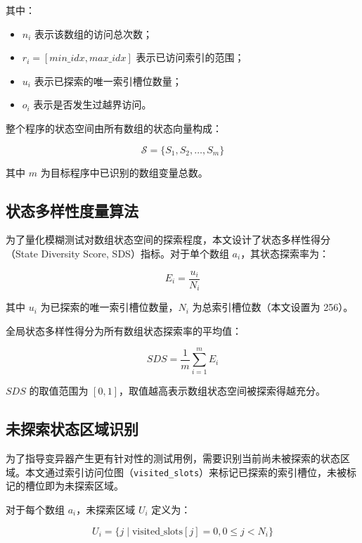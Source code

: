 \documentclass[bachelor]{njupthesis}
\begin{document}
其中：
\begin{itemize}
    \item $n_i$ 表示该数组的访问总次数；
    \item $r_i = [min\_idx, max\_idx]$ 表示已访问索引的范围；
    \item $u_i$ 表示已探索的唯一索引槽位数量；
    \item $o_i$ 表示是否发生过越界访问。
\end{itemize}

整个程序的状态空间由所有数组的状态向量构成：

\begin{equation}
\mathcal{S} = \{S_1, S_2, \ldots, S_m\}
\end{equation}

其中 $m$ 为目标程序中已识别的数组变量总数。

\subsection{状态多样性度量算法}

为了量化模糊测试对数组状态空间的探索程度，本文设计了状态多样性得分（State Diversity Score, SDS）指标。对于单个数组 $a_i$，其状态探索率为：

\begin{equation}
E_i = \frac{u_i}{N_i}
\end{equation}

其中 $u_i$ 为已探索的唯一索引槽位数量，$N_i$ 为总索引槽位数（本文设置为 256）。

全局状态多样性得分为所有数组状态探索率的平均值：

\begin{equation}
SDS = \frac{1}{m} \sum_{i=1}^{m} E_i
\end{equation}

$SDS$ 的取值范围为 $[0, 1]$，取值越高表示数组状态空间被探索得越充分。

\subsection{未探索状态区域识别}

为了指导变异器产生更有针对性的测试用例，需要识别当前尚未被探索的状态区域。本文通过索引访问位图（\texttt{visited\_slots}）来标记已探索的索引槽位，未被标记的槽位即为未探索区域。

对于每个数组 $a_i$，未探索区域 $U_i$ 定义为：

\begin{equation}
U_i = \{j \mid \text{visited\_slots}[j] = 0, 0 \leq j < N_i\}
\end{equation}
\end{document}
